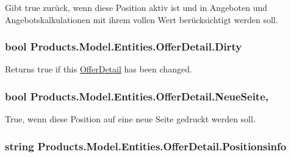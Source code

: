 Gibt true zurück, wenn diese Position aktiv ist und in Angeboten und Angebotskalkulationen mit ihrem vollen Wert berücksichtigt werden soll. 

\subsubsection[{\texorpdfstring{Dirty}{Dirty}}]{\setlength{\rightskip}{0pt plus 5cm}bool Products.\+Model.\+Entities.\+Offer\+Detail.\+Dirty\hspace{0.3cm}{\ttfamily [get]}}\hypertarget{class_products_1_1_model_1_1_entities_1_1_offer_detail_a235495491bec9b068176289f64b09b6f}{}\label{class_products_1_1_model_1_1_entities_1_1_offer_detail_a235495491bec9b068176289f64b09b6f}


Returns true if this \hyperlink{class_products_1_1_model_1_1_entities_1_1_offer_detail}{Offer\+Detail} has been changed. 

\subsubsection[{\texorpdfstring{Neue\+Seite}{NeueSeite}}]{\setlength{\rightskip}{0pt plus 5cm}bool Products.\+Model.\+Entities.\+Offer\+Detail.\+Neue\+Seite\hspace{0.3cm}{\ttfamily [get]}, {\ttfamily [set]}}\hypertarget{class_products_1_1_model_1_1_entities_1_1_offer_detail_ab48004c165a603137684ff3d7a4acf4c}{}\label{class_products_1_1_model_1_1_entities_1_1_offer_detail_ab48004c165a603137684ff3d7a4acf4c}


True, wenn diese Position auf eine neue Seite gedruckt werden soll. 

\subsubsection[{\texorpdfstring{Positionsinfo}{Positionsinfo}}]{\setlength{\rightskip}{0pt plus 5cm}string Products.\+Model.\+Entities.\+Offer\+Detail.\+Positionsinfo\hspace{0.3cm}{\ttfamily [get]}}\hypertarget{class_products_1_1_model_1_1_entities_1_1_offer_detail_a83d35caf73235daa629b56a2fab5faf9}{}\label{class_products_1_1_model_1_1_entities_1_1_offer_detail_a83d35caf73235daa629b56a2fab5faf9}


